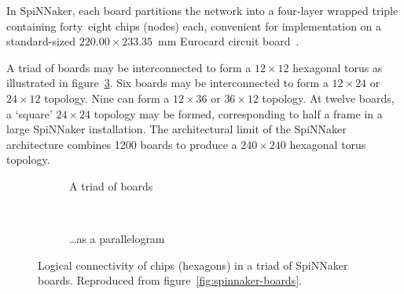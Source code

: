 		In SpiNNaker, each board partitions the network into a four-layer wrapped
		triple containing forty~eight chips (nodes) each, convenient for
		implementation on a standard-sized $220.00\times233.35$~\si{\milli\meter}
		Eurocard circuit board~\cite{ieee11011}.
		
		A triad of boards may be interconnected to form a $12\times12$ hexagonal
		torus as illustrated in figure~\ref{fig:threeboard-apdx}. Six boards may be
		interconnected to form a $12\times24$ or $24\times12$ topology. Nine can
		form a $12\times36$ or $36\times12$ topology. At twelve boards, a `square'
		$24\times24$ topology may be formed, corresponding to half a frame in a
		large SpiNNaker installation. The architectural limit of the SpiNNaker
		architecture combines \num{1200} boards to produce a $240\times240$
		hexagonal torus topology.
		
		\begin{figure}
			\center
			\begin{subfigure}[b]{0.45\linewidth}
				\center
				
				\caption{A triad of boards}
				\label{fig:threeboard-separate-apdx}
			\end{subfigure}
			~~~
			\begin{subfigure}[b]{0.45\linewidth}
				\center
				
				\caption{\ldots{}as a parallelogram}
				\label{fig:threeboard-wrapped-apdx}
			\end{subfigure}
			
			\caption[Logical connectivity of chips in a triad of SpiNNaker boards.]%
			{Logical connectivity of chips (hexagons) in a triad of SpiNNaker
			boards. Reproduced from figure~\ref{fig:spinnaker-boards}.}
			\label{fig:threeboard-apdx}
		\end{figure}
